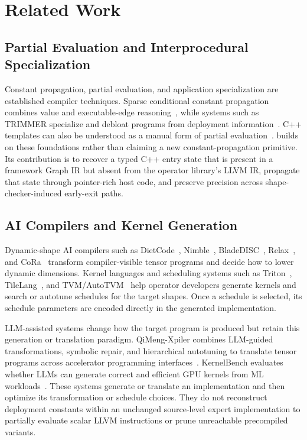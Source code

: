 \section{Related Work}
\label{sec:related}

\subsection{Partial Evaluation and Interprocedural Specialization}

Constant propagation, partial evaluation, and application specialization are established compiler techniques.
Sparse conditional constant propagation combines value and executable-edge reasoning~\cite{Wegman1991ConstantPropagationConditional}, while systems such as TRIMMER specialize and debloat programs from deployment information~\cite{Sharif2018TRIMMERApplicationSpecialization}.
C++ templates can also be understood as a manual form of partial evaluation~\cite{veldhuizen1998ctemplatespartialevaluation}.
\mysys builds on these foundations rather than claiming a new constant-propagation primitive.
Its contribution is to recover a typed C++ entry state that is present in a framework Graph IR but absent from the operator library's LLVM IR, propagate that state through pointer-rich host code, and preserve precision across shape-checker-induced early-exit paths.

\subsection{AI Compilers and Kernel Generation}

Dynamic-shape AI compilers such as DietCode~\cite{zheng2022dietcode}, Nimble~\cite{shen2021nimble}, BladeDISC~\cite{zheng2023bladedisc}, Relax~\cite{Lai2023RelaxCA}, and CoRa~\cite{fegade2022cora} transform compiler-visible tensor programs and decide how to lower dynamic dimensions.
Kernel languages and scheduling systems such as Triton~\cite{tillet2019triton}, TileLang~\cite{tilelang}, and TVM/AutoTVM~\cite{chen2018tvm} help operator developers generate kernels and search or autotune schedules for the target shapes.
Once a schedule is selected, its schedule parameters are encoded directly in the generated implementation.

LLM-assisted systems change how the target program is produced but retain this generation or translation paradigm.
QiMeng-Xpiler combines LLM-guided transformations, symbolic repair, and hierarchical autotuning to translate tensor programs across accelerator programming interfaces~\cite{dong2025qimengxpiler}.
KernelBench evaluates whether LLMs can generate correct and efficient GPU kernels from ML workloads~\cite{ouyang2025kernelbench}.
These systems generate or translate an implementation and then optimize its transformation or schedule choices.
They do not reconstruct deployment constants within an unchanged source-level expert implementation to partially evaluate scalar LLVM instructions or prune unreachable precompiled variants.

